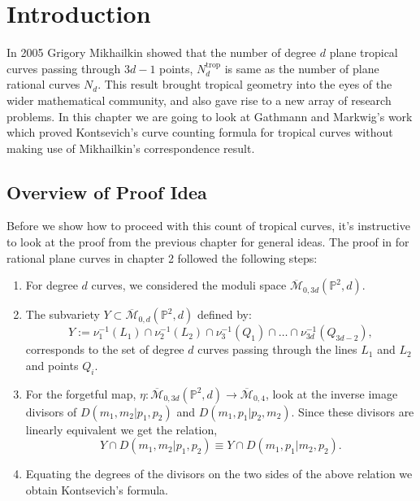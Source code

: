 \section{Introduction}
In 2005 Grigory Mikhailkin showed that the number of degree $d$ plane tropical curves passing through $3d-1$ points, $N^{\text{trop}}_{d}$ is same as the number of plane rational curves $N_{d}$.
This result brought tropical geometry into the eyes of the wider mathematical community, and also gave rise to a new array of research problems.
In this chapter we are going to look at Gathmann and Markwig's work which proved Kontsevich's curve counting formula for tropical curves without making use of Mikhailkin's correspondence result.

\subsection{Overview of Proof Idea}
Before we show how to proceed with this count of tropical curves, it's instructive to look at the proof from the previous chapter for general ideas.
The proof in for rational plane curves in chapter 2 followed the following steps:
\begin{enumerate}
    \item For degree $d$ curves, we considered the moduli space $\overline{\mathcal{M}}_{0,3d}(\mathbb{P}^{2},d)$.
    \item The subvariety $Y \subset \overline{\mathcal{M}}_{0,d}(\mathbb{P}^{2},d)$ defined by:
        \[
            Y:= \nu_{1}^{-1}(L_{1}) \cap \nu_{2}^{-1}(L_{2}) \cap \nu_{3}^{-1}(Q_{1}) \cap \dots \cap \nu_{3d}^{-1}(Q_{3d-2}),
        \]
        corresponds to the set of degree $d$ curves passing through the lines $L_{1}$ and $L_{2}$ and points $Q_{i}$.
    \item For the forgetful map, $\eta: \overline{\mathcal{M}}_{0,3d}(\mathbb{P}^{2},d)\to \overline{\mathcal{M}}_{0,4}$, look at the inverse image divisors of $D(m_{1}, m_{2}|p_{1}, p_{2})$ and $D(m_{1}, p_{1}|p_{2}, m_{2})$.
        Since these divisors are linearly equivalent we get the relation, 
        \[
            Y \cap D(m_{1}, m_{2} | p_{1}, p_{2}) \equiv Y \cap D(m_{1}, p_{1} | m_{2}, p_{2}).
        \]
    \item Equating the degrees of the divisors on the two sides of the above relation we obtain Kontsevich's formula.
\end{enumerate}

